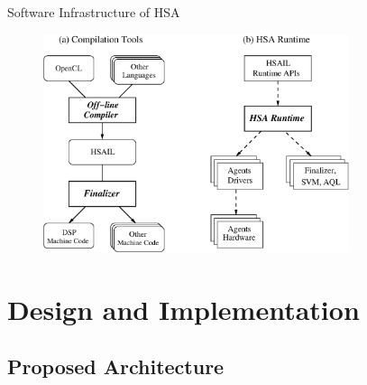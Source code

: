 \documentclass{beamer}
\begin{document}
\begin{CJK}{UTF8}{bkai}
    \begin{frame}{Software Infrastructure of HSA}
        \begin{figure}[!ht] 
            \centering
            \includegraphics[width=0.8\textwidth]{./figs/swinf.eps}
            \label{fig:swinf}
        \end{figure}
    \end{frame}


    \section{Design and Implementation}
    \subsection{Proposed Architecture}


\end{CJK}
\end{document}
